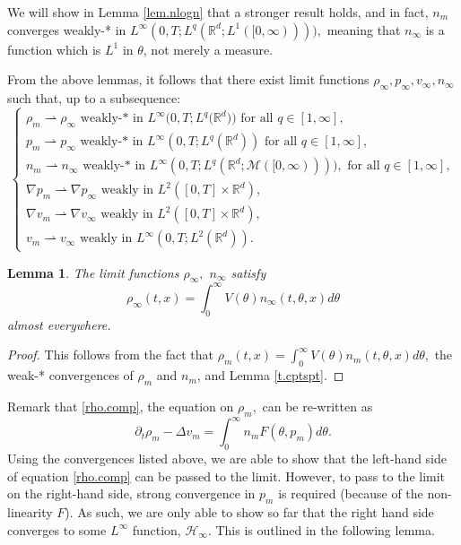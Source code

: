 \documentclass{amsart}
\newtheorem{lemma}[theorem]{Lemma}
\def\R{\mathbb R}
\begin{document}
We will show in Lemma \ref{lem.nlogn} that a stronger result holds, and in fact, $n_m$ converges weakly-* in $L^\infty(0,T;L^q(\R^d;L^1([0,\infty)))),$ meaning that $n_\infty$ is a function which is $L^1$ in $\theta$, not merely a measure.

From the above lemmas, it follows that there exist limit functions $\rho_\infty, p_\infty,v_\infty,n_\infty$ such that, up to a subsequence:
\begin{equation*}
    \begin{cases}
        \rho_m \rightharpoonup \rho_\infty \text{ weakly-* in $L^\infty(0,T;L^q( \R^d$))}\text{ for all } q \in [1,\infty],\\
        p_m \rightharpoonup p_\infty \text{ weakly-* in } L^\infty(0,T; L^q(\R^d)) \text{ for all } q \in [1,\infty],\\
        n_m\rightharpoonup n_\infty \text{ weakly-* in } L^\infty(0,T;L^q(\R^d;\mathcal{M}([0,\infty)))), \text{ for all } q \in [1,\infty], \\
        \nabla p_m \rightharpoonup \nabla p_\infty \text{ weakly in } L^2([0,T]\times \R^d),\\
        \nabla v_m \rightharpoonup  \nabla v_\infty \text{ weakly in } L^2([0,T]\times \R^d),\\
        v_m \rightharpoonup v_\infty \text{ weakly in } L^\infty(0,T;L^2(\R^d)).
    \end{cases}
\end{equation*}
\begin{lemma}
    The limit functions $\rho_\infty,$ $n_\infty$ satisfy 
    $$
    \rho_\infty(t,x)=\int_{0}^{\infty}V(\theta)n_\infty(t,\theta,x) d\theta
    $$ almost everywhere.
\end{lemma}
\begin{proof}
    This follows from the fact that $\rho_m(t,x)=\int_{0}^{\infty}V(\theta)n_m(t,\theta,x)d\theta,$ the weak-* convergences of $\rho_m$ and $n_m$, and Lemma \ref{t.cptspt}.
\end{proof}
Remark that \eqref{rho.comp}, the equation on $\rho_m,$ can be re-written as \begin{equation}\label{v.eq}
\partial_t \rho_m -\Delta v_m=\int_{0}^{\infty}n_mF(\theta,p_m)d\theta.
\end{equation}
Using the convergences listed above, we are able to show that the left-hand side of equation \eqref{rho.comp} can be passed to the limit. However, to pass to the limit on the right-hand side, strong convergence in $p_m$ is required (because of the non-linearity $F$). As such, we are only able to show so far that the right hand side converges to some $L^\infty$ function, $\mathcal{H}_\infty.$ This is outlined in the following lemma.
\end{document}
